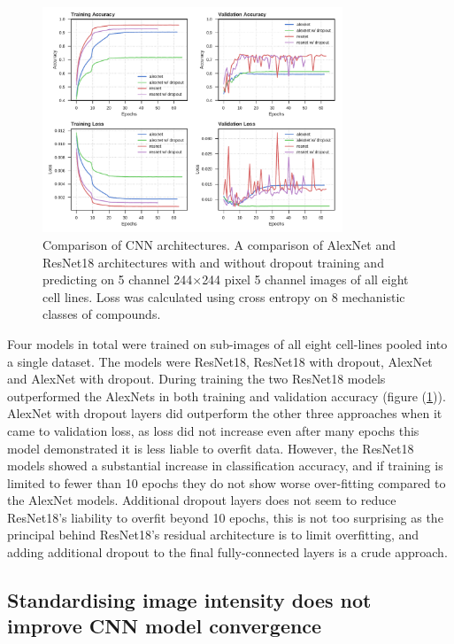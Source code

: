 \documentclass[a4paper,11pt,twoside,openright]{scrbook}
\begin{document}
\begin{figure}
    \includegraphics[width=0.8\textwidth]{ch2arch}
    \captionsetup{width=0.8\textwidth}
    \caption[Comparison of CNN architectures]{
Comparison of CNN architectures.
A comparison of AlexNet and ResNet18 architectures with and without dropout training and predicting on 5 channel 244$\times$244 pixel 5 channel images of all eight cell lines.
Loss was calculated using cross entropy on 8 mechanistic classes of compounds.}
    \label{figure:nn_arch}
\end{figure}

Four models in total were trained on sub-images of all eight cell-lines pooled into a single dataset.
The models were ResNet18, ResNet18 with dropout, AlexNet and AlexNet with dropout.
During training the two ResNet18 models outperformed the AlexNets in both training and validation accuracy (figure (\ref{figure:nn_arch})).
AlexNet with dropout layers did outperform the other three approaches when it came to validation loss, as loss did not increase even after many epochs this model demonstrated it is less liable to overfit data.
However, the ResNet18 models showed a substantial increase in classification accuracy, and if training is limited to fewer than 10 epochs they do not show worse over-fitting compared to the AlexNet models.
Additional dropout layers does not seem to reduce ResNet18's liability to overfit beyond 10 epochs, this is not too surprising as the principal behind ResNet18's residual architecture is to limit overfitting, and adding additional dropout to the final fully-connected layers is a crude approach.



\subsection{Standardising image intensity does not improve CNN model convergence}
\end{document}
